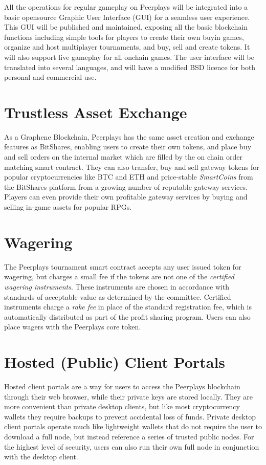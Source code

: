 \documentclass[a4paper,titlepage,final]{article}
\begin{document}
All the operations for regular gameplay on Peerplays will be integrated into a basic open­source Graphic User Interface (GUI) for a seamless user experience. This GUI will be published and maintained, exposing all the basic blockchain functions including simple tools for players to create their own buy­in games, organize and host multi­player tournaments, and buy, sell and create tokens. It will also support live gameplay for all on­chain games. The user interface will be translated into several languages, and will have a modified BSD licence for both personal and commercial use. 

\section{Trustless Asset Exchange}

As a Graphene Blockchain, Peerplays has the same asset creation and exchange features as BitShares,​\cite{9} enabling users to create their own tokens, and place buy and sell orders on the internal market which are filled by the on chain order matching smart contract. They can also transfer, buy and sell gateway tokens for popular cryptocurrencies like BTC and ETH and price-stable \textit{​SmartCoins} from the BitShares platform from a growing number of reputable gateway services. Players can even provide their own profitable gateway services by buying and selling in-game assets for popular RPGs.

\section{Wagering}

The Peerplays tournament smart contract accepts any user issued token for wagering, but charges a small fee if the tokens are not one of the \textit{certified wagering instruments}. These instruments are chosen in accordance with standards of acceptable value as determined by the committee. Certified instruments charge a \textit{rake fee} in place of the standard registration fee, which is automatically distributed as part of the profit sharing program. Users can also place wagers with the Peerplays core token.

\section{Hosted (Public) Client Portals}

Hosted client portals are a way for users to access the Peerplays blockchain through their web browser,​\cite{10} while their private keys are stored locally. They are more convenient than private desktop clients, but like most cryptocurrency wallets they require backups to prevent accidental loss of funds. Private desktop client portals operate much like lightweight wallets that do not require the user to download a full node, but instead reference a series of trusted public nodes. For the highest level of security, users can also run their own full node in conjunction with the desktop client. 
\end{document}
